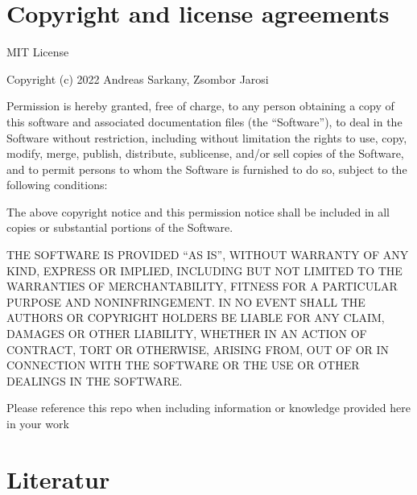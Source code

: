 \documentclass[letterpaper,10pt,english]{jupyterBook}
\begin{document}
\chapter{Copyright and license agreements}
\label{\detokenize{LICENSE:copyright-and-license-agreements}}\label{\detokenize{LICENSE::doc}}
\sphinxAtStartPar
MIT License

\sphinxAtStartPar
Copyright (c) 2022 Andreas Sarkany, Zsombor Jarosi

\sphinxAtStartPar
Permission is hereby granted, free of charge, to any person obtaining a copy of this software and associated
documentation files (the “Software”), to deal in the Software without restriction, including without limitation the
rights to use, copy, modify, merge, publish, distribute, sublicense, and/or sell copies of the Software, and to permit
persons to whom the Software is furnished to do so, subject to the following conditions:

\sphinxAtStartPar
The above copyright notice and this permission notice shall be included in all copies or substantial portions of the
Software.

\sphinxAtStartPar
THE SOFTWARE IS PROVIDED “AS IS”, WITHOUT WARRANTY OF ANY KIND, EXPRESS OR IMPLIED, INCLUDING BUT NOT LIMITED TO THE
WARRANTIES OF MERCHANTABILITY, FITNESS FOR A PARTICULAR PURPOSE AND NONINFRINGEMENT. IN NO EVENT SHALL THE AUTHORS OR
COPYRIGHT HOLDERS BE LIABLE FOR ANY CLAIM, DAMAGES OR OTHER LIABILITY, WHETHER IN AN ACTION OF CONTRACT, TORT OR
OTHERWISE, ARISING FROM, OUT OF OR IN CONNECTION WITH THE SOFTWARE OR THE USE OR OTHER DEALINGS IN THE SOFTWARE.

\sphinxAtStartPar
Please reference this repo when including information or knowledge provided here in your work

\sphinxstepscope


\chapter{Literatur}
\label{\detokenize{References:literatur}}\label{\detokenize{References:references}}\label{\detokenize{References::doc}}\label{\detokenize{References:id1}}






\renewcommand{\indexname}{Index}
\printindex
\end{document}
